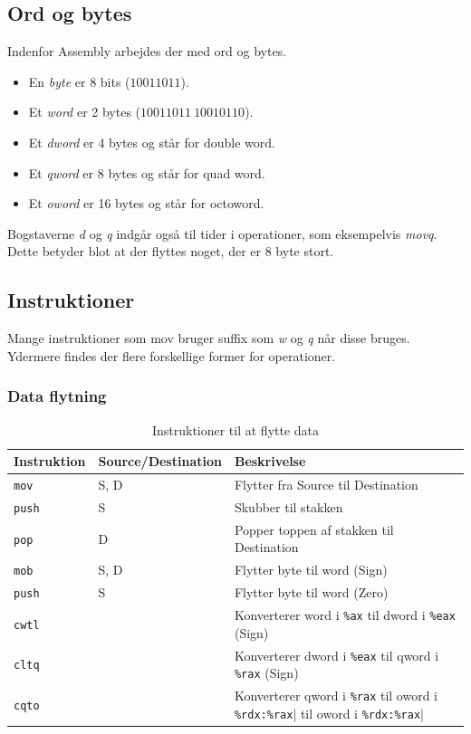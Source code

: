 \subsection{Ord og bytes}
Indenfor Assembly arbejdes der med ord og bytes.
\begin{itemize}
    \item En \textit{byte} er 8 bits ($10011011$).
    \item Et \textit{word} er 2 bytes ($10011011\:10010110$).
    \item Et \textit{dword} er 4 bytes og står for double word.
    \item Et \textit{qword} er 8 bytes og står for quad word.
    \item Et \textit{oword} er 16 bytes og står for octoword.
\end{itemize}
Bogstaverne \textit{d} og \textit{q} indgår også til tider i operationer, som eksempelvis \textit{movq}.
Dette betyder blot at der flyttes noget, der er 8 byte stort.
\subsection{Instruktioner}
Mange instruktioner som mov bruger suffix som \textit{w} og \textit{q} når disse bruges.
Ydermere findes der flere forskellige former for operationer.
\subsubsection{Data flytning}
\begin{table}[h!]
    \centering
    \begin{tabular}{ll|l}
        Instruktion&Source/Destination&Beskrivelse\\\hline
        \verb|mov|&S, D&Flytter fra Source til Destination\\
        \verb|push|&S&Skubber til stakken\\
        \verb|pop|&D&Popper toppen af stakken til Destination\\\hline
        \verb|mob|&S, D&Flytter byte til word (Sign)\\
        \verb|push|&S&Flytter byte til word (Zero)\\\hline
        \verb|cwtl|&&Konverterer word i \verb|%ax| til dword i \verb|%eax| (Sign)\\
        \verb|cltq|&&Konverterer dword i \verb|%eax| til qword i \verb|%rax| (Sign)\\
        \verb|cqto|&&Konverterer qword i \verb|%rax| til oword i \verb|%rdx:%rax|
    \end{tabular}
    \caption{Instruktioner til at flytte data}
\end{table}
